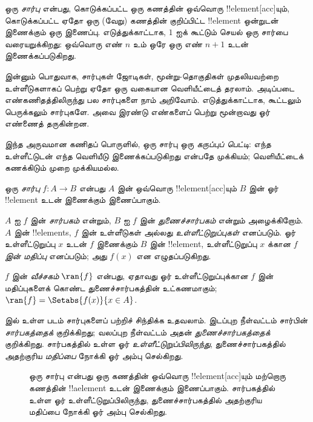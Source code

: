 \documentclass[../../../include/open-logic-section]{subfiles}
\begin{document}

\begin{explain}
ஒரு \emph{சார்பு} என்பது, கொடுக்கப்பட்ட ஒரு கணத்தின் ஒவ்வொரு
!!{element}[acc]யும், கொடுக்கப்பட்ட ஏதோ ஒரு (வேறு) கணத்தின் குறிப்பிட்ட
!!{element} ஒன்றுடன் இணைக்கும் ஒரு இணைப்பு. எடுத்துக்காட்டாக,
$1$ ஐக் கூட்டும் செயல் ஒரு சார்பை வரையறுக்கிறது: ஒவ்வொரு எண் $n$ உம்
ஒரே ஒரு எண் $n+1$ உடன் இணைக்கப்படுகிறது.

இன்னும் பொதுவாக, சார்புகள் ஜோடிகள், மூன்று-தொகுதிகள் முதலியவற்றை
உள்ளீடுகளாகப் பெற்று ஏதோ ஒரு வகையான வெளியீட்டைத் தரலாம்.
அடிப்படை எண்கணிதத்திலிருந்து பல சார்புகளை நாம் அறிவோம்.
எடுத்துக்காட்டாக, கூட்டலும் பெருக்கலும் சார்புகளே. அவை இரண்டு எண்களைப்
பெற்று மூன்றாவது ஓர் எண்ணைத் தருகின்றன.

இந்த அருவமான கணிதப் பொருளில், ஒரு சார்பு ஒரு \emph{கருப்புப் பெட்டி}:
எந்த உள்ளீட்டுடன் எந்த வெளியீடு இணைக்கப்படுகிறது என்பதே முக்கியம்;
வெளியீட்டைக் கணக்கிடும் முறை முக்கியமல்ல.
\end{explain}

\begin{defn}[சார்பு]
ஒரு \emph{சார்பு} $f \colon A \to B$ என்பது $A$ இன் ஒவ்வொரு
!!{element}[acc]யும் $B$ இன் ஓர் !!{element} உடன் இணைக்கும் இணைப்பாகும்.

$A$ ஐ $f$ இன் \emph{சார்பகம்} என்றும், $B$ ஐ $f$ இன்
\emph{துணைச்சார்பகம்} என்றும் அழைக்கிறோம்.
$A$ இன் !!{element}s, $f$ இன் உள்ளீடுகள் அல்லது
\emph{உள்ளீட்டுறுப்புகள்} எனப்படும். ஓர் உள்ளீட்டுறுப்பு $x$ உடன்
$f$ இணைக்கும் $B$ இன் !!{element}, உள்ளீட்டுறுப்பு $x$ க்கான
\emph{$f$ இன் மதிப்பு} எனப்படும்; அது $f(x)$ என எழுதப்படுகிறது.

$f$ இன் \emph{வீச்சகம்} $\ran{f}$ என்பது, ஏதாவது ஓர்
உள்ளீட்டுறுப்புக்கான $f$ இன் மதிப்புகளைக் கொண்ட துணைச்சார்பகத்தின்
உட்கணமாகும்; $\ran{f} =
\Setabs{f(x)}{x \in A}$.
\end{defn}

 இல் உள்ள படம் சார்புகளைப் பற்றிச் சிந்திக்க உதவலாம்.
இடப்புற நீள்வட்டம் சார்பின் \emph{சார்பகத்தைக்} குறிக்கிறது;
வலப்புற நீள்வட்டம் அதன் \emph{துணைச்சார்பகத்தைக்} குறிக்கிறது.
சார்பகத்தில் உள்ள ஓர் \emph{உள்ளீட்டுறுப்பிலிருந்து}, துணைச்சார்பகத்தில்
அதற்குரிய \emph{மதிப்பை} நோக்கி ஓர் அம்பு செல்கிறது.

\begin{figure}
  \caption{ஒரு சார்பு என்பது ஒரு கணத்தின் ஒவ்வொரு !!{element}[acc]யும்
    மற்றொரு கணத்தின் !!a{element} உடன் இணைக்கும் இணைப்பாகும்.
    சார்பகத்தில் உள்ள ஓர் உள்ளீட்டுறுப்பிலிருந்து, துணைச்சார்பகத்தில்
    அதற்குரிய மதிப்பை நோக்கி ஓர் அம்பு செல்கிறது.}
\end{figure}
\end{document}
